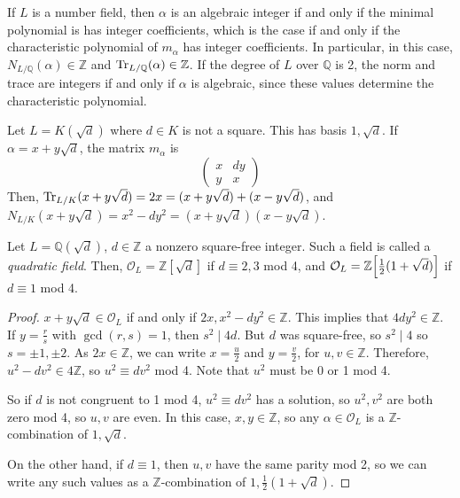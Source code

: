 If \( L \) is a number field, then \( \alpha \) is an algebraic integer if and only if the minimal polynomial is has integer coefficients, which is the case if and only if the characteristic polynomial of \( m_\alpha \) has integer coefficients.
In particular, in this case, \( N_{L/\mathbb Q}(\alpha) \in \mathbb Z \) and \( \Tr_{L/\mathbb Q}(\alpha) \in \mathbb Z \).
If the degree of \( L \) over \( \mathbb Q \) is 2, the norm and trace are integers if and only if \( \alpha \) is algebraic, since these values determine the characteristic polynomial.
\begin{example}
    Let \( L = K(\sqrt{d}) \) where \( d \in K \) is not a square.
    This has basis \( 1, \sqrt d \).
    If \( \alpha = x + y\sqrt d \), the matrix \( m_\alpha \) is
    \[ \begin{pmatrix}
        x & dy \\
        y & x
    \end{pmatrix} \]
    Then, \( \Tr_{L/K}(x+y\sqrt d) = 2x = (x+y\sqrt d) + (x-y\sqrt d) \), and \( N_{L/K}(x+y\sqrt d) = x^2 - dy^2 = (x+y\sqrt d)(x - y\sqrt d) \).
\end{example}
\begin{lemma}
    Let \( L = \mathbb Q(\sqrt{d}) \), \( d \in \mathbb Z \) a nonzero square-free integer.
    Such a field is called a \emph{quadratic field}.
    Then, \( \mathcal O_L = \mathbb Z[\sqrt d] \) if \( d \equiv 2, 3 \) mod 4, and \( \mathcal O_L = \mathbb Z\qty[\frac{1}{2}(1+\sqrt d)] \) if \( d \equiv 1 \) mod 4.
\end{lemma}
\begin{proof}
    \( x + y \sqrt d \in \mathcal O_L \) if and only if \( 2x, x^2 - dy^2 \in \mathbb Z \).
    This implies that \( 4 dy^2 \in \mathbb Z \).
    If \( y = \frac{r}{s} \) with \( \gcd(r,s) = 1 \), then \( s^2 \mid 4d \).
    But \( d \) was square-free, so \( s^2 \mid 4 \) so \( s = \pm 1, \pm 2 \).
    As \( 2x \in \mathbb Z \), we can write \( x = \frac{u}{2} \) and \( y = \frac{v}{2} \), for \( u, v \in \mathbb Z \).
    Therefore, \( u^2 - dv^2 \in 4\mathbb Z \), so \( u^2 \equiv dv^2 \) mod 4.
    Note that \( u^2 \) must be 0 or 1 mod 4.

    So if \( d \) is not congruent to 1 mod 4, \( u^2 \equiv dv^2 \) has a solution, so \( u^2, v^2 \) are both zero mod 4, so \( u, v \) are even.
    In this case, \( x, y \in \mathbb Z \), so any \( \alpha \in \mathcal O_L \) is a \( \mathbb Z \)-combination of \( 1, \sqrt d \).

    On the other hand, if \( d \equiv 1 \), then \( u, v \) have the same parity mod 2, so we can write any such values as a \( \mathbb Z \)-combination of \( 1, \frac{1}{2}(1+\sqrt d) \).
\end{proof}
